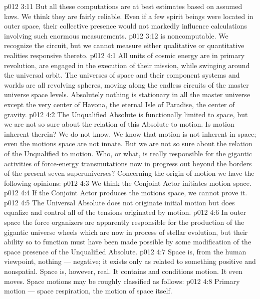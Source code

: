 \vs p012 3:11 But all these computations are at best estimates based on assumed laws. We think they are fairly reliable. Even if a few spirit beings were located in outer space, their collective presence would not markedly influence calculations involving such enormous measurements.
\vs p012 3:12 \pc {} is noncomputable. We recognize the circuit, but we cannot measure either qualitative or quantitative realities responsive thereto.
\vs p012 4:1 All units of cosmic energy are in primary revolution, are engaged in the execution of their mission, while swinging around the universal orbit. The universes of space and their component systems and worlds are all revolving spheres, moving along the endless circuits of the master universe space levels. Absolutely nothing is stationary in all the master universe except the very center of Havona, the eternal Isle of Paradise, the center of gravity.
\vs p012 4:2 The Unqualified Absolute is functionally limited to space, but we are not so sure about the relation of this Absolute to motion. Is motion inherent therein? We do not know. We know that motion is not inherent in space; even the motions  space are not innate. But we are not so sure about the relation of the Unqualified to motion. Who, or what, is really responsible for the gigantic activities of force\hyp{}energy transmutations now in progress out beyond the borders of the present seven superuniverses? Concerning the origin of motion we have the following opinions:
\vs p012 4:3 \bibnobreakspace We think the Conjoint Actor initiates motion  space.
\vs p012 4:4 \bibnobreakspace If the Conjoint Actor produces the motions  space, we cannot prove it.
\vs p012 4:5 \bibnobreakspace The Universal Absolute does not originate initial motion but does equalize and control all of the tensions originated by motion.
\vs p012 4:6 \pc In outer space the force organizers are apparently responsible for the production of the gigantic universe wheels which are now in process of stellar evolution, but their ability so to function must have been made possible by some modification of the space presence of the Unqualified Absolute.
\vs p012 4:7 \pc Space is, from the human viewpoint, nothing --- negative; it exists only as related to something positive and nonspatial. Space is, however, real. It contains and conditions motion. It even moves. Space motions may be roughly classified as follows:
\vs p012 4:8 \bibnobreakspace Primary motion --- space respiration, the motion of space itself.
